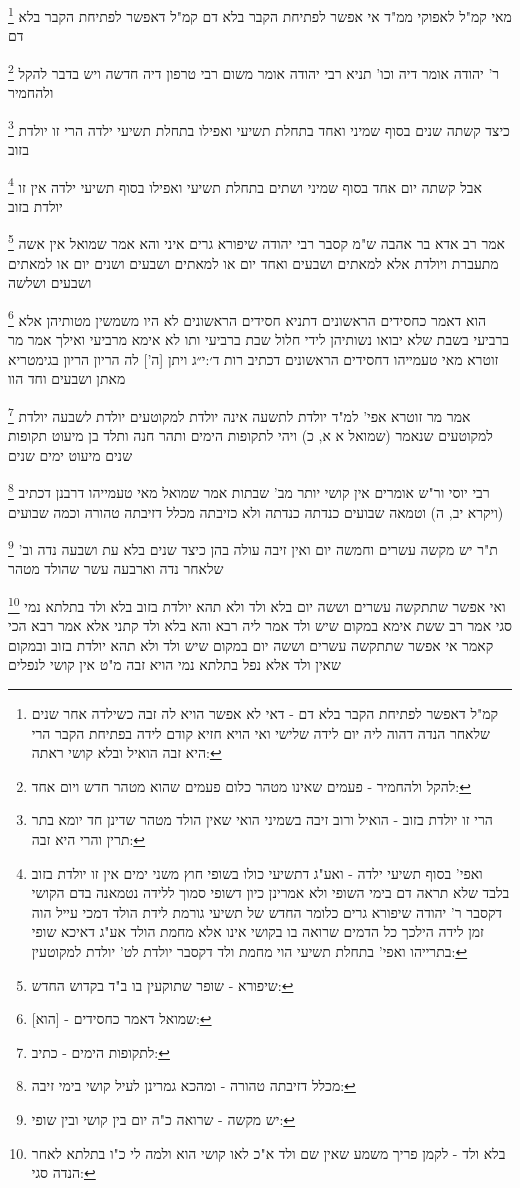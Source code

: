 \documentclass[12pt, openany]{book}
\newcommand{\footnotecomment}[1]{
	\renewcommand\thefootnote{}
	\footnote{#1}}
\newcommand{\commenta}[1]{\footnotecomment{#1}}
\begin{document}
{{\commenta{קמ"ל דאפשר לפתיחת הקבר בלא דם - דאי לא אפשר הויא לה זבה כשילדה אחר שנים שלאחר הנדה דהוה ליה יום לידה שלישי ואי הויא חזיא קודם לידה בפתיחת הקבר הרי היא זבה הואיל ובלא קושי ראתה:}
מאי קמ"ל לאפוקי ממ"ד אי אפשר לפתיחת הקבר בלא דם קמ"ל דאפשר לפתיחת הקבר בלא דם
\commenta{להקל ולהחמיר - פעמים שאינו מטהר כלום פעמים שהוא מטהר חדש ויום אחד:}
ר' יהודה אומר דיה וכו' תניא רבי יהודה אומר משום רבי טרפון דיה חדשה ויש בדבר להקל ולהחמיר 
\commenta{הרי זו יולדת בזוב - הואיל ורוב זיבה בשמיני הואי שאין הולד מטהר שדינן חד יומא בתר תרין והרי היא זבה:}
כיצד קשתה שנים בסוף שמיני ואחד בתחלת תשיעי ואפילו בתחלת תשיעי ילדה הרי זו יולדת בזוב
\commenta{ואפי' בסוף תשיעי ילדה - ואע"ג דתשיעי כולו בשופי חוץ משני ימים אין זו יולדת בזוב בלבד שלא תראה דם בימי השופי ולא אמרינן כיון דשופי סמוך ללידה נטמאנה בדם הקושי דקסבר ר' יהודה שיפורא גרים כלומר החדש של תשיעי גורמת לידת הולד דמכי עייל הוה זמן לידה הילכך כל הדמים שרואה בו בקושי אינו אלא מחמת הולד אע"ג דאיכא שופי בתרייהו ואפי' בתחלת תשיעי הוי מחמת ולד דקסבר יולדת לט' יולדת למקוטעין:}
אבל קשתה יום אחד בסוף שמיני ושתים בתחלת תשיעי ואפילו בסוף תשיעי ילדה אין זו יולדת בזוב 
\commenta{שיפורא - שופר שתוקעין בו ב"ד בקדוש החדש:}
אמר רב אדא בר אהבה ש"מ קסבר רבי יהודה שיפורא גרים איני והא אמר שמואל אין אשה מתעברת ויולדת אלא למאתים ושבעים ואחד יום או למאתים ושבעים ושנים יום או למאתים ושבעים ושלשה 
\commenta{[הוא] - שמואל דאמר כחסידים:}
הוא דאמר כחסידים הראשונים דתניא חסידים הראשונים לא היו משמשין מטותיהן אלא ברביעי בשבת שלא יבואו נשותיהן
לידי חלול שבת ברביעי ותו לא אימא מרביעי ואילך 
אמר מר זוטרא מאי טעמייהו דחסידים הראשונים דכתיב {רות ד׳:י״ג } ויתן [ה'] לה הריון הריון בגימטריא מאתן ושבעים וחד הוו 
\commenta{לתקופות הימים - כתיב:}
אמר מר זוטרא אפי' למ"ד יולדת לתשעה אינה יולדת למקוטעים יולדת לשבעה יולדת למקוטעים שנאמר (שמואל א א, כ) ויהי לתקופות הימים ותהר חנה ותלד בן מיעוט תקופות שנים מיעוט ימים שנים
\commenta{מכלל דזיבתה טהורה - ומהכא גמרינן לעיל קושי בימי זיבה:}
רבי יוסי ור"ש אומרים אין קושי יותר מב' שבתות אמר שמואל מאי טעמייהו דרבנן דכתיב (ויקרא יב, ה) וטמאה שבועים כנדתה כנדתה ולא כזיבתה מכלל דזיבתה טהורה וכמה שבועים 
\commenta{יש מקשה - שרואה כ"ה יום בין קושי ובין שופי:}
ת"ר יש מקשה עשרים וחמשה יום ואין זיבה עולה בהן כיצד שנים בלא עת ושבעה נדה וב' שלאחר נדה וארבעה עשר שהולד מטהר 
\commenta{בלא ולד - לקמן פריך משמע שאין שם ולד א"כ לאו קושי הוא ולמה לי כ"ו בתלתא לאחר הנדה סגי:}
ואי אפשר שתתקשה עשרים וששה יום בלא ולד ולא תהא יולדת בזוב 
בלא ולד בתלתא נמי סגי אמר רב ששת אימא במקום שיש ולד אמר ליה רבא והא בלא ולד קתני 
אלא אמר רבא הכי קאמר אי אפשר שתתקשה עשרים וששה יום במקום שיש ולד ולא תהא יולדת בזוב ובמקום שאין ולד אלא נפל בתלתא נמי הויא זבה מ"ט אין קושי לנפלים
}}
\end{document}
